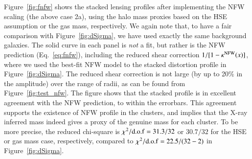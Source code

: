 \documentclass[iop, apj]{emulateapj}
\newcommand{\simlt}{\lower.5ex\hbox{$\; \buildrel < \over \sim \;$}}
\newcommand{\?}{\stackrel{?}{=}}
\begin{document}
Figure~\ref{fig:fnfw} shows the stacked lensing profiles after
implementing the NFW scaling (the above case 2a), using the halo mass
proxies based on the HSE assumption or the gas mass, respectively.  We
again note that, to have a fair comparison with Figure~\ref{fig:dSigma},
we have used exactly the same background galaxies.  The solid curve in
each panel is {\it not} a fit, but rather is the NFW prediction
(Eq.~\ref{eq:fnfw}), including the reduced shear correction
$1/[1-\kappa^{\rm NFW}(x)]$, where we used the best-fit NFW model to the
stacked distortion profile in Figure~\ref{fig:dSigma}. The reduced shear
correction is not large (by up to 20\% in the amplitude) over the range
of radii,
as can be
found from Figure~\ref{fig:test_nfw}.  The figure shows that the stacked
profile is in excellent agreement with the NFW prediction, to within the
errorbars. This agreement supports the existence of NFW profile in the
clusters, and implies that the X-ray inferred mass indeed gives a proxy
of the genuine mass for each cluster. To be more precise, the reduced
chi-square is $\chi^2/{\rm d.o.f}=31.3/32$ or $30.7/32$ for the HSE or
gas mass case, respectively, compared to $\chi^2/{\rm
d.o.f}=22.5/(32-2)$ in Figure~\ref{fig:dSigma}.
\end{document}
